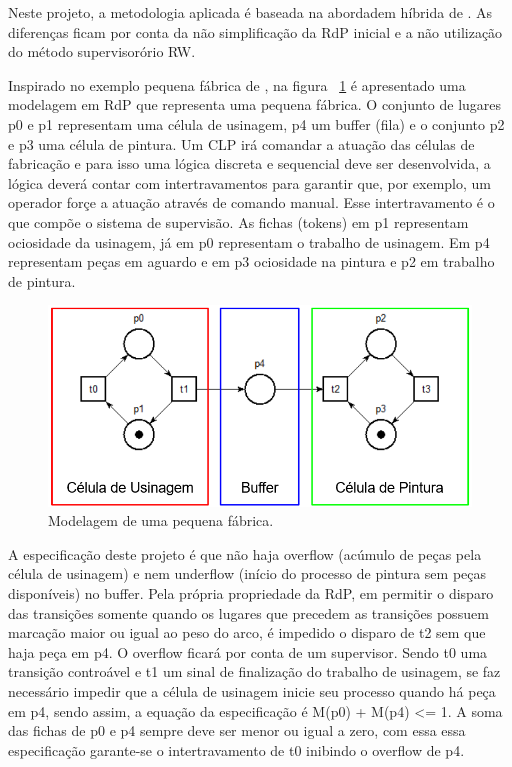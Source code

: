 Neste projeto, a metodologia aplicada \'e baseada na abordadem h\'ibrida de \cite{UzamWonham2005}. As diferen\c{c}as ficam por conta da n\~ao simplifica\c{c}\~ao da RdP inicial e a n\~ao utiliza\c{c}\~ao do m\'etodo supervisor\'orio RW.

Inspirado no exemplo pequena f\'abrica de \cite{apostilacury}, na figura ~\ref{fig:pqnafab} \'e apresentado uma modelagem em RdP que representa uma pequena f\'abrica. O conjunto de lugares p0 e p1 representam uma c\'elula de usinagem, p4 um buffer (fila) e o conjunto p2 e p3 uma c\'elula de pintura. Um CLP ir\'a comandar a atua\c{c}\~ao das c\'elulas de fabrica\c{c}\~ao e para isso uma l\'ogica discreta e sequencial deve ser desenvolvida, a l\'ogica dever\'a contar com intertravamentos para garantir que, por exemplo, um operador for\c{c}e a atua\c{c}\~ao atrav\'es de comando manual. Esse intertravamento \'e o que comp\~oe o sistema de supervis\~ao.
As fichas (tokens) em p1 representam ociosidade da usinagem, j\'a em p0 representam o trabalho de usinagem. Em p4 representam pe\c{c}as em aguardo e em p3 ociosidade na pintura e p2 em trabalho de pintura.\

\begin{figure}[!htb]
	\caption[Modelagem de uma pequena f\'abrica.]{Modelagem de uma pequena f\'abrica.}
	\label{fig:pqnafab}
	\includegraphics[width=16cm]{./figuras/PQNAFAB.png}\centering
\end{figure}

A especifica\c{c}\~ao deste projeto \'e que n\~ao haja overflow (ac\'umulo de pe\c{c}as pela c\'elula de usinagem) e nem underflow (in\'icio do processo de pintura sem pe\c{c}as dispon\'iveis) no buffer. Pela pr\'opria propriedade da RdP, em permitir o disparo das transi\c{c}\~oes somente quando os lugares que precedem as transi\c{c}\~oes possuem marca\c{c}\~ao maior ou igual ao peso do arco, \'e impedido o disparo de t2 sem que haja pe\c{c}a em p4. O overflow ficar\'a por conta de um supervisor. Sendo t0 uma transi\c{c}\~ao contro\'avel e t1 um sinal de finaliza\c{c}\~ao do trabalho de usinagem, se faz necess\'ario impedir que a c\'elula de usinagem inicie seu processo quando h\'a pe\c{c}a em p4, sendo assim, a equa\c{c}\~ao da especifica\c{c}\~ao \'e M(p0) + M(p4) <= 1. A soma das fichas de p0 e p4 sempre deve ser menor ou igual a zero, com essa essa especifica\c{c}\~ao garante-se o intertravamento de t0 inibindo o overflow de p4.

